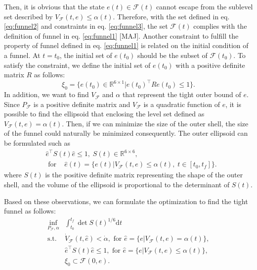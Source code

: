 \documentclass[letterpaper, 10 pt, conference]{ieeeconf}  %
\begin{document}
Then, it is obvious that the state $e(t) \in \mathcal{F}(t)$ cannot escape from the sublevel set described by $V_\mathcal{F}(t,e) \leq \alpha(t)$.
Therefore, with the set defined in eq. \eqref{eq:funnel2} and constraints in eq. \eqref{eq:funnel3}, 
the set $\mathcal{F}(t)$ complies with the definition of funnel in eq. \eqref{eq:funnel1} [MAJ]. 
Another constraint to fulfill the property of funnel defined in eq. \eqref{eq:funnel1} is related on the initial condition of a funnel. 
At $t = t_0$, the initial set of $e(t_0)$ should be the subset of $\mathcal{F}(t_0)$. 
To satisfy the constraint, we define the initial set of $e(t_0)$ with a positive definite matrix $R$ as follows:
\begin{equation}
\xi_0 = \{e(t_0) \in \mathbb{R}^{6\times1}|e(t_0)^\intercal R e(t_0) \leq 1\}.
\end{equation} 
In addition, we want to find $V_\mathcal{F}$ and $\alpha$ that represent the tight outer bound of $e$. 
Since $P_\mathcal{F}$ is a positive definite matrix and $V_\mathcal{F}$ is a quadratic function of $e$, 
it is possible to find the ellipsoid that enclosing the level set defined as $V_\mathcal{F}(t,e) = \alpha(t)$.
Then, if we can minimize the size of the outer shell, the size of the funnel could naturally be minimized consequently.
The outer ellipsoid can be formulated such as
\begin{align}
&\hat{e}^\intercal S(t) \hat{e} \leq 1,\;S(t) \in \mathbb{R}^{6\times 6}, \nonumber \\
&\text{ for }\;\;\;\hat{e}(t) = \{e(t)|V_\mathcal{F}(t,e) \leq \alpha(t),\;t \in [t_0,t_f]\}. \nonumber
\end{align}
where $S(t)$ is the positive definite matrix representing the shape of the outer shell, and the volume of the ellipsoid is proportional to the determinant of $S(t)$.

Based on these observations, we can formulate the optimization to find the tight funnel as follows:
\begin{equation}
\begin{array}{rl}
\displaystyle{\inf_{P_\mathcal{F},\alpha}} & \int_{t_0}^{t_f} \det{S(t)}^{1/6}\text{d}t \nonumber \\
\displaystyle{\text{s.t.}}& \dot{V}_\mathcal{F}(t,\hat{e}) < \dot{\alpha},\text{ for }\hat{e} = \{e|V_\mathcal{F}(t,e) = \alpha(t)\}, \nonumber \\
& \hat{e}^\intercal S(t) \hat{e} \leq 1,\text{ for }\hat{e} = \{e|V_\mathcal{F}(t,e) \leq \alpha(t)\}, \nonumber \\
& \xi_0 \subset \mathcal{F}(0,e).
\end{array}
\end{equation}
\end{document}
